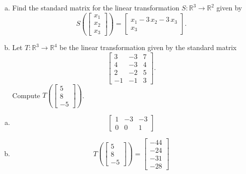 
\begin{exerciseStatement}

\begin{enumerate}[(a)]
\item Find the standard matrix for the linear transformation \(S:\mathbb{R}^ 3  \to \mathbb{R}^ 2 \) given by \[S\left(  \left[\begin{array}{c}
x_{1} \\
x_{2} \\
x_{3}
\end{array}\right]  \right) =  \left[\begin{array}{c}
x_{1} - 3 \, x_{2} - 3 \, x_{3} \\
x_{3}
\end{array}\right] .\]
\item Let \(T:\mathbb{R}^ 3  \to \mathbb{R}^ 4 \) be the linear transformation given by the standard matrix \[ \left[\begin{array}{ccc}
3 & -3 & 7 \\
4 & -3 & 4 \\
2 & -2 & 5 \\
-1 & -1 & 3
\end{array}\right] .\] Compute \(T\left( \left[\begin{array}{c}
5 \\
8 \\
-5
\end{array}\right]  \right)\). 
\end{enumerate}
    
\end{exerciseStatement}
    
\begin{exerciseAnswer} 

\begin{enumerate}[(a)]
\item \[ \left[\begin{array}{ccc}
1 & -3 & -3 \\
0 & 0 & 1
\end{array}\right] \]
\item \[T\left( \left[\begin{array}{c}
5 \\
8 \\
-5
\end{array}\right]  \right)= \left[\begin{array}{c}
-44 \\
-24 \\
-31 \\
-28
\end{array}\right] \]
\end{enumerate}
    
\end{exerciseAnswer}
    
